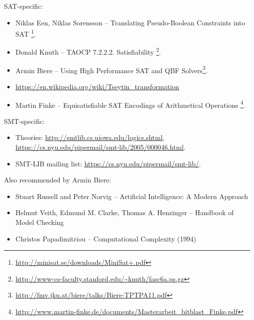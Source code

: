 SAT-specific:

\begin{itemize}

\item Niklas Een, Niklas Sorensson -- Translating Pseudo-Boolean Constraints into SAT
\footnote{\url{http://minisat.se/downloads/MiniSat+.pdf}}.

\item Donald Knuth -- \ac{TAOCP} 7.2.2.2. Satisfiability
\footnote{\url{http://www-cs-faculty.stanford.edu/~knuth/fasc6a.ps.gz}}.

\item Armin Biere -- Using High Performance SAT and QBF Solvers\footnote{\url{http://fmv.jku.at/biere/talks/Biere-TPTPA11.pdf}}.

\item \url{https://en.wikipedia.org/wiki/Tseytin_transformation}

\item Martin Finke -- Equisatisfiable SAT Encodings of Arithmetical Operations
\footnote{\url{http://www.martin-finke.de/documents/Masterarbeit_bitblast_Finke.pdf}}.

\end{itemize}

SMT-specific:

\begin{itemize}
\item Theories: \url{http://smtlib.cs.uiowa.edu/logics.shtml}, \url{https://cs.nyu.edu/pipermail/smt-lib/2005/000046.html}.

\item SMT-LIB mailing list: \url{https://cs.nyu.edu/pipermail/smt-lib/}.
\end{itemize}

Also recommended by Armin Biere:

\begin{itemize}
\item Stuart Russell and Peter Norvig -- Artificial Intelligence: A Modern Approach

\item Helmut Veith, Edmund M. Clarke, Thomas A. Henzinger -- Handbook of Model Checking

\item Christos Papadimitriou -- Computational Complexity (1994)
\end{itemize}

